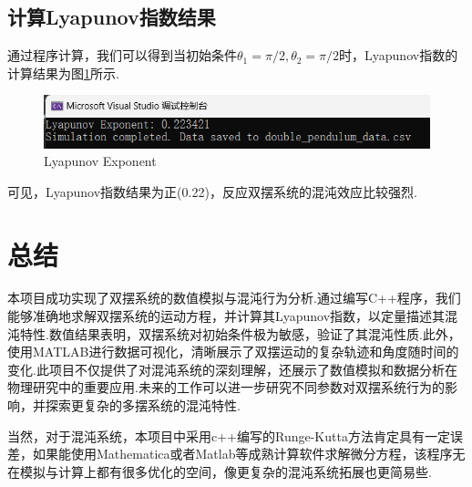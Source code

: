 \documentclass[12pt, a4paper, oneside]{article}
\begin{document}
\subsection{计算Lyapunov指数结果}
通过程序计算，我们可以得到当初始条件$\theta_1 = \pi/2, \theta_2 = \pi/2$时，Lyapunov指数的计算结果为图\ref{fig:lyapunov_exponent}所示.
\begin{figure}[htbp]
	\centering
	\includegraphics[width = 16 cm]{figures/lyapunov.png}
	\caption{Lyapunov Exponent}
	\label{fig:lyapunov_exponent}
\end{figure}

可见，Lyapunov指数结果为正(0.22)，反应双摆系统的混沌效应比较强烈.
\section{总结}
本项目成功实现了双摆系统的数值模拟与混沌行为分析.通过编写C++程序，我们能够准确地求解双摆系统的运动方程，并计算其Lyapunov指数，以定量描述其混沌特性.数值结果表明，双摆系统对初始条件极为敏感，验证了其混沌性质.此外，使用MATLAB进行数据可视化，清晰展示了双摆运动的复杂轨迹和角度随时间的变化.此项目不仅提供了对混沌系统的深刻理解，还展示了数值模拟和数据分析在物理研究中的重要应用.未来的工作可以进一步研究不同参数对双摆系统行为的影响，并探索更复杂的多摆系统的混沌特性.

当然，对于混沌系统，本项目中采用c++编写的Runge-Kutta方法肯定具有一定误差，如果能使用Mathematica或者Matlab等成熟计算软件求解微分方程，该程序无在模拟与计算上都有很多优化的空间，像更复杂的混沌系统拓展也更简易些.

\newpage
\appendix
\end{document}

